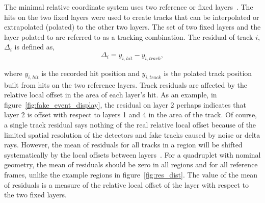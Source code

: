 
The minimal relative coordinate system uses two reference or fixed layers~\cite{lefebvre_thesis}. The hits on the two fixed layers were used to create tracks that can be interpolated or extrapolated (polated) to the other two layers. The set of two fixed layers and the layer polated to are referred to as a tracking combination. The residual of track $i$, $\Delta_i$ is defined as,
\begin{equation}
    \Delta_i = y_{i,hit} - y_{i,track},
    \label{eqn:residual}
\end{equation}

where $y_{i,hit}$ is the recorded hit position and $y_{i,track}$ is the polated track position built from hits on the two reference layers. Track residuals are affected by the relative local offset in the area of each layer's hit. As an example, in figure~\ref{fig:fake_event_display}, the residual on layer 2 perhaps indicates that layer 2 is offset with respect to layers 1 and 4 in the area of the track. Of course, a single track residual says nothing of the real relative local offset because of the limited spatial resolution of the detectors and fake tracks caused by noise or delta rays. However, the mean of residuals for all tracks in a region will be shifted systematically by the local offsets between layers~\cite{lefebvre_thesis}. For a quadruplet with nominal geometry, the mean of residuals should be zero in all regions and for all reference frames, unlike the example regions in figure~\ref{fig:res_dist}. The value of the mean of residuals is a measure of the relative local offset of the layer with respect to the two fixed layers.

